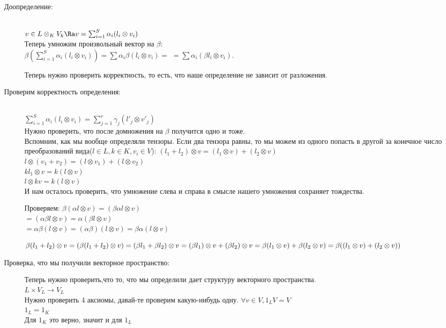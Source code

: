 \begin{description}
\begin{description}
\begin{description}
    \item[Доопределение:] \hfill \\
$v \in L \otimes_K V_k \Ra v = \sum_{i = 1}^{S}\alpha_i (l_i \otimes v_i)$\\
Теперь умножим произвольный вектор на $\beta:$\\
$\beta (\sum_{i = 1}^{S}\alpha_i(l_i \otimes v_i)) = \sum \alpha_i \beta(l_i \otimes v_i) = $
$= \sum \alpha_i(\beta l_i \otimes v_i)$.

Теперь нужно проверить корректность, то есть, 
что наше определение не зависит от разложения.

    \item[Проверим корректность определения:]\hfill \\
$\sum_{i = 1}^{S}\alpha_i(l_i \otimes v_i) = \sum_{j = 1}^{r}\gamma_j(l'_j \otimes v'_j)$\\
Нужно проверить, что после домножения на $\beta$ получится одно и тоже.\\

Вспомним, как мы вообще определяли тензоры. Если два тензора равны, то мы можем из 
одного попасть в другой за конечное число преобразований вида($l \in L, k \in K, v_i \in V$):
$(l_1 + l_2)\otimes v = (l_1 \otimes v) + (l_2\otimes v)$ \\
$l\otimes(v_1 + v_2) = (l\otimes v_1) + (l \otimes v_2)$ \\
$kl_1 \otimes v =  k(l\otimes v)$\\ 
$l\otimes kv = k(l\otimes v)$\\

И нам осталось проверить, что умножение слева и справа в смысле нашего умножения
сохраняет тождества.

Проверяем:
$\beta(\alpha l \otimes v) = (\beta \alpha l \otimes v)$\\
$= (\alpha \beta l \otimes v) = \alpha (\beta l \otimes v)$\\
$= \alpha \beta(l \otimes v) = (\alpha \beta)(l \otimes v) = \beta \alpha (l \otimes v)$

$\beta(l_1 + l_2)\otimes v = (\beta(l_1 + l_2) \otimes v) = (\beta l_1 + \beta l_2)\otimes v = \\
(\beta l_1) \otimes v + (\beta l_2) \otimes v = \beta(l_1 \otimes v)+ \beta(l_2 \otimes v) = \beta((l_1 \otimes v) + (l_2 \otimes v))$                                       

\item[Проверка, что мы получили векторное пространство:]
Теперь нужно проверить,что то, что мы определили дает структуру векторного пространства.\\ 
$L \times V_L \to V_L$\\
Нужно проверить 4 аксиомы, давай-те проверим какую-нибудь одну. 
$\forall v \in V, 1_L V = V$\\
$1_L = 1_K$\\
Для $1_K$ это верно, значит и для $1_L$\\


\end{description}
\end{description}
\end{description}

